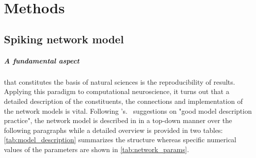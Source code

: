 \chapter{Methods}
\label{sec:methods}

\section{Spiking network model}
\label{subsec:methods_simulation}
\paragraph{A fundamental aspect} that constitutes the basis of natural sciences 
is the reproducibility of results. Applying this paradigm to computational neuroscience, 
it turns out that a detailed description of the constituents, 
the connections and implementation of the network models is vital. 
Following \citeauthor{nordlie2009}'s.~\cite{nordlie2009} suggestions on 
"good model description practice",
the network model is described in in a top-down manner over the following paragraphs 
while a detailed 
overview is provided in two tables: 
\autoref{tab:model_description}
summarizes the structure 
whereas specific numerical values of the parameters are shown in 
\autoref{tab:network_params}. 


